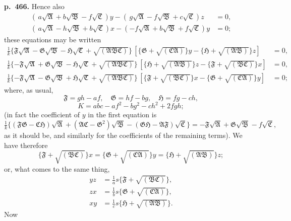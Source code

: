 \documentclass[11pt]{article}
\begin{document}
\bigskip
\noindent\textbf{p.~466.} Hence also
\[
\begin{aligned}
(\,a\sqrt{\mathfrak{A}} + b\sqrt{\mathfrak{B}} - f\sqrt{\mathfrak{C}})y - (\,g\sqrt{\mathfrak{A}} - f\sqrt{\mathfrak{B}} + c\sqrt{\mathfrak{C}})z &= 0,\\
(\,a\sqrt{\mathfrak{A}} - h\sqrt{\mathfrak{B}} + b\sqrt{\mathfrak{C}})x - (-f\sqrt{\mathfrak{A}} + b\sqrt{\mathfrak{B}} + f\sqrt{\mathfrak{C}})y &= 0;
\end{aligned}
\]
these equations may be written
\[
\begin{aligned}
\tfrac{1}{k}\{\mathfrak{F}\sqrt{\mathfrak{A}} - \mathfrak{G}\sqrt{\mathfrak{B}} - \mathfrak{H}\sqrt{\mathfrak{C}} + \sqrt{(\mathfrak{ABC})}\}\,[\{\mathfrak{G} + \sqrt{(\mathfrak{CA})}\}y - \{\mathfrak{H} + \sqrt{(\mathfrak{AB})}\}z] &= 0,\\
\tfrac{1}{k}\{-\mathfrak{F}\sqrt{\mathfrak{A}} + \mathfrak{G}\sqrt{\mathfrak{B}} - \mathfrak{H}\sqrt{\mathfrak{C}} + \sqrt{(\mathfrak{ABC})}\}\,[\{\mathfrak{H} + \sqrt{(\mathfrak{AB})}\}z - \{\mathfrak{F} + \sqrt{(\mathfrak{BC})}\}x] &= 0,\\
\tfrac{1}{k}\{-\mathfrak{F}\sqrt{\mathfrak{A}} - \mathfrak{G}\sqrt{\mathfrak{B}} + \mathfrak{H}\sqrt{\mathfrak{C}} + \sqrt{(\mathfrak{ABC})}\}\,[\{\mathfrak{F} + \sqrt{(\mathfrak{BC})}\}x - \{\mathfrak{G} + \sqrt{(\mathfrak{CA})}\}y] &= 0;
\end{aligned}
\]
where, as usual,
\[ \mathfrak{F} = gh - af,\quad \mathfrak{G} = hf - bg,\quad \mathfrak{H} = fg - ch, \]
\[ K = abc - af^2 - bg^2 - ch^2 + 2fgh; \]
(in fact the coefficient of $y$ in the first equation is
\[ \tfrac{1}{k}\{(\mathfrak{FG} - \mathfrak{CH})\sqrt{\mathfrak{A}} + (\mathfrak{AC} - \mathfrak{G}^2)\sqrt{\mathfrak{B}} - (\mathfrak{GH} - \mathfrak{AF})\sqrt{\mathfrak{C}}\} = -\mathfrak{F}\sqrt{\mathfrak{A}} + \mathfrak{G}\sqrt{\mathfrak{B}} - f\sqrt{\mathfrak{C}}, \]
as it should be, and similarly for the coefficients of the remaining terms). We have therefore
\[ \{\mathfrak{F} + \sqrt{(\mathfrak{BC})}\}x = \{\mathfrak{G} + \sqrt{(\mathfrak{CA})}\}y = \{\mathfrak{H} + \sqrt{(\mathfrak{AB})}\}z; \]
or, what comes to the same thing,
\[
\begin{aligned}
yz &= \tfrac{1}{a}s\{\mathfrak{F} + \sqrt{(\mathfrak{BC})}\},\\
zx &= \tfrac{1}{b}s\{\mathfrak{G} + \sqrt{(\mathfrak{CA})}\},\\
xy &= \tfrac{1}{c}s\{\mathfrak{H} + \sqrt{(\mathfrak{AB})}\}.
\end{aligned}
\]
Now
\end{document}
